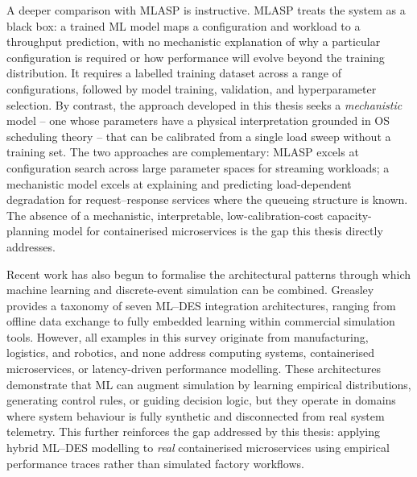 A deeper comparison with MLASP is instructive. MLASP treats the system as a black box: a trained ML model maps a configuration and workload to a throughput prediction, with no mechanistic explanation of why a particular configuration is required or how performance will evolve beyond the training distribution. It requires a labelled training dataset across a range of configurations, followed by model training, validation, and hyperparameter selection. By contrast, the approach developed in this thesis seeks a \emph{mechanistic} model -- one whose parameters have a physical interpretation grounded in OS scheduling theory -- that can be calibrated from a single load sweep without a training set. The two approaches are complementary: MLASP excels at configuration search across large parameter spaces for streaming workloads; a mechanistic model excels at explaining and predicting load-dependent degradation for request--response services where the queueing structure is known. The absence of a mechanistic, interpretable, low-calibration-cost capacity-planning model for containerised microservices is the gap this thesis directly addresses.

Recent work has also begun to formalise the architectural patterns through which machine learning and discrete-event simulation can be combined. Greasley~\cite{Greasley2020} provides a taxonomy of seven ML--DES integration architectures, ranging from offline data exchange to fully embedded learning within commercial simulation tools. However, all examples in this survey originate from manufacturing, logistics, and robotics, and none address computing systems, containerised microservices, or latency-driven performance modelling. These architectures demonstrate that ML can augment simulation by learning empirical distributions, generating control rules, or guiding decision logic, but they operate in domains where system behaviour is fully synthetic and disconnected from real system telemetry. This further reinforces the gap addressed by this thesis: applying hybrid ML--DES modelling to \emph{real} containerised microservices using empirical performance traces rather than simulated factory workflows.

